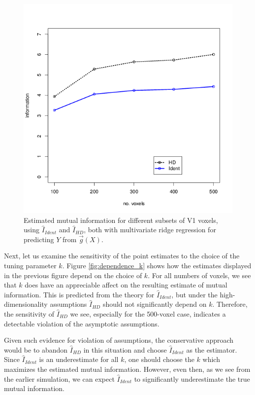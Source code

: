 \begin{figure}
\centering
\includegraphics[scale = 0.5]{../../Yuval/info_infer_edited.png}
\caption{Estimated mutual information for different subsets of V1 voxels, using $\hat{I}_{Ident}$ and $\hat{I}_{HD}$, both with multivariate ridge regression for predicting $Y$ from $\vec{g}(X)$.}
\label{fig:n_voxels_vs_mi}
\end{figure}

Next, let us examine the sensitivity of the point estimates to the
choice of the tuning parameter $k$.  Figure \ref{fig:dependence_k}
shows how the estimates displayed in the previous figure depend on the
choice of $k$.  For all numbers of voxels, we see that $k$ does have
an appreciable affect on the resulting estimate of mutual information.
This is predicted from the theory for $\hat{I}_{Ident}$, but under the
high-dimensionality assumptions $\hat{I}_{HD}$ should not
significantly depend on $k$.  Therefore, the sensitivity of
$\hat{I}_{HD}$ we see, especially for the 500-voxel case, indicates a
detectable violation of the asymptotic assumptions.

Given such evidence for violation of assumptions, the conservative
approach would be to abandon $\hat{I}_{HD}$ in this situation and
choose $\hat{I}_{Ident}$ as the estimator. Since $\hat{I}_{Ident}$ is
an underestimate for all $k$, one should choose the $k$ which
maximizes the estimated mutual information.  However, even then, as we
see from the earlier simulation, we can expect $\hat{I}_{Ident}$ to
significantly underestimate the true mutual information.

